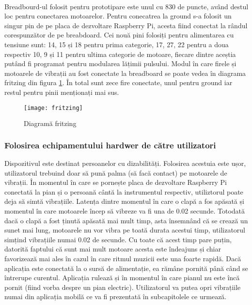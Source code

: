 \documentclass[../IoMusT.tex]{subfiles}
\begin{document}
\\
\par Breadbourd-ul folosit pentru prototipare este unul cu 830 de puncte, având destul loc pentru conectarea motoarelor. Pentru conecatrea la ground s-a folosit un singur pin de pe placa de dezvoltare  Raspberry Pi, acesta fiind conectat la rândul corespunzător de pe breabdoard. Cei nouă pini folosiți pentru alimentarea cu tensiune sunt: 14, 15 și 18 pentru prima categorie, 17, 27, 22 pentru a doua respectiv 10, 9 și 11 pentru ultima categorie de motoare, fiecare dintre aceștia putând fi programat pentru modularea lățimii pulsului. Modul în care firele și motoarele de vibrații au fost conectate la breadboard se poate vedea în diagrama fritzing din figura \ref{fig:breadboardConnection}. În total sunt zece fire conectate, unul pentru ground iar restul pentru pinii menționați mai sus.
\begin{figure}[h]
\centering
\texttt{[image: fritzing]}
\caption{Diagramă fritzing}
\label{fig:breadboardConnection}
\end{figure}  
\newpage
\subsubsection{Folosirea echipamentului hardwer de către utilizatori}
Dispozitivul este destinat persoanelor  cu dizabilități. Folosirea acestuia este ușor, utilizatorul trebuind doar să pună palma (să facă contact) pe motoarele de vibrații. În momentul în care se pornește placa de dezvoltare Raspberry Pi conectată la pian și o persoană cântă la instrumentul respectiv, utiliztorul poate deja să simtă vibrațiile. Latența dintre momentul în care o clapă a fos apăsată și momentul în care motoarele încep să vibreze va fi una de 0.02 secunde. Totodată dacă o clapă a fost ținută apăsată mai mult timp, asta însemnând că se crează un sunet mai lung, motoarele nu vor vibra pe toată durata acestui timp, utilizatorul simțind vibrațiile numai 0.02 de secunde. Cu toate că acest timp pare puțin, datorită faptului că sunt mai mult motoare acesta este îndeajuns și chiar favorizează mai ales în cazul în care ritmul muzicii este una foarte rapidă. Dacă aplicația este conectată la o sursă de alimentație, ea rămâne pornită până când se întrerupe curentul. Aplicația rulează și în momentul în care pianul nu este încă pornit (fiind vorba despre un pian electric). Utilizatorul va putea opri vibrațiile numai din aplicația mobilă ce va fi prezentată în subcapitolele ce urmează.
\end{document}
